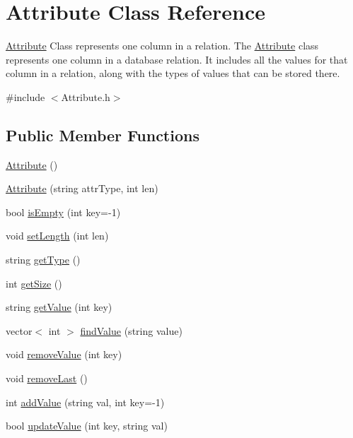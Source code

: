 \hypertarget{class_attribute}{\section{Attribute Class Reference}
\label{class_attribute}
}


\hyperlink{class_attribute}{Attribute} Class represents one column in a relation. The \hyperlink{class_attribute}{Attribute} class represents one column in a database relation. It includes all the values for that column in a relation, along with the types of values that can be stored there.  




{\ttfamily \#include $<$Attribute.\-h$>$}

\subsection*{Public Member Functions}
\begin{DoxyCompactItemize}
\item 
\hyperlink{class_attribute_a8ba4e5a507aef352563e1e56f1930e66}{Attribute} ()
\item 
\hyperlink{class_attribute_a02233dafef63f06ff9402c160e0f9373}{Attribute} (string attr\-Type, int len)
\item 
bool \hyperlink{class_attribute_a1ef67e13c131f9e3ac6a6a2adbb6e5aa}{is\-Empty} (int key=-\/1)
\item 
void \hyperlink{class_attribute_ace0103128f51d118718413c48ba5180d}{set\-Length} (int len)
\item 
string \hyperlink{class_attribute_a7fbbc68ab2f0dbef61e783842deca1e3}{get\-Type} ()
\item 
int \hyperlink{class_attribute_aab394210caea68ab5fc7bbab5ce33abe}{get\-Size} ()
\item 
string \hyperlink{class_attribute_a8df7ea306c5eede720d1933f6a46c337}{get\-Value} (int key)
\item 
vector$<$ int $>$ \hyperlink{class_attribute_aae6bd7cf63b3f8069721048d2a9c8ef7}{find\-Value} (string value)
\item 
void \hyperlink{class_attribute_a714539d4184caef6ad6accd8b29dcb4c}{remove\-Value} (int key)
\item 
void \hyperlink{class_attribute_af75dab2d3c606606d8fca11bb54d4314}{remove\-Last} ()
\item 
int \hyperlink{class_attribute_a2e7e01c0077452815fd6e0420d15ba06}{add\-Value} (string val, int key=-\/1)
\item 
bool \hyperlink{class_attribute_a248d912b1d34554143e4424d0228198b}{update\-Value} (int key, string val)
\end{DoxyCompactItemize}
